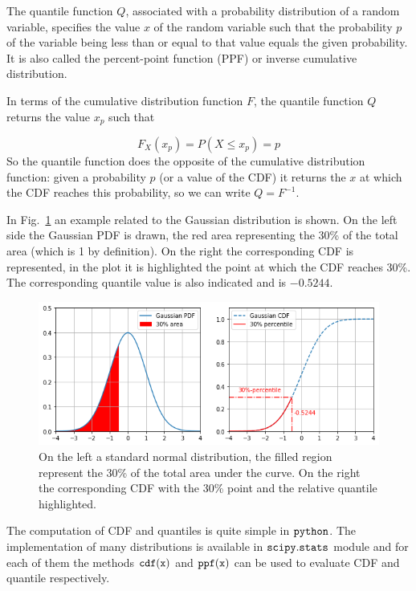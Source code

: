 The quantile function $Q$, associated with a probability distribution of a random variable, 
specifies the value $x$ of the random variable such that the probability $p$ of the 
variable being less than or equal to that value equals the given probability.
It is also called the percent-point function (PPF) or inverse cumulative distribution.

In terms of the cumulative distribution function \(F\), the quantile function \(Q\)
returns the value \(x_p\) such that 

\begin{equation}
F_{X}(x_p)=P(X\le x_p)=p
\end{equation}
So the quantile function does the opposite of the cumulative distribution function: 
given a probability \(p\) (or a value of the CDF) it returns the \(x\) at which the 
CDF reaches this probability, so we can write $Q=F^{-1}$.

In Fig.~\ref{fig:percentile} an example related to the
Gaussian distribution is shown. On the left side the Gaussian PDF is drawn,
the red area representing the 30\% of the total area (which is 1 by definition). 
On the right the corresponding CDF is represented, in the plot it is highlighted the point 
at which the CDF reaches 30\%. The corresponding quantile value is also indicated and 
is $-0.5244$.

\begin{figure}[htb]
	\centering
	\includegraphics[width=1.\textwidth]{figures/percentile.png}
	\caption{On the left a standard normal distribution, the filled region represent the 30\% of the total area
		under the curve. On the right the corresponding CDF with the 30\% point and the relative quantile highlighted.}
	\label{fig:percentile}
\end{figure}

The computation of CDF and quantiles is quite simple in \(\tt{python}\).
The implementation of many distributions is available in \(\tt{scipy.stats}\)
module and for each of them the methods \(\tt{cdf(x)}\) and
\(\tt{ppf(x)}\) can be used to evaluate CDF and quantile respectively.


